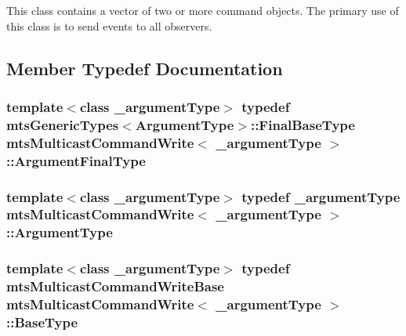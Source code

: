 This class contains a vector of two or more command objects. The primary use of this class is to send events to all observers. 

\subsection{Member Typedef Documentation}
\hypertarget{classmts_multicast_command_write_a6a53ad6556ef466ffc58b8800ca81f46}{
\subsubsection[{Argument\-Final\-Type}]{\setlength{\rightskip}{0pt plus 5cm}template$<$class \-\_\-argument\-Type$>$ typedef {\bf mts\-Generic\-Types}$<${\bf Argument\-Type}$>$\-::Final\-Base\-Type {\bf mts\-Multicast\-Command\-Write}$<$ \-\_\-argument\-Type $>$\-::{\bf Argument\-Final\-Type}}}\label{classmts_multicast_command_write_a6a53ad6556ef466ffc58b8800ca81f46}
\hypertarget{classmts_multicast_command_write_a064ab3c37be15f5f41dc6fd39595f207}{
\subsubsection[{Argument\-Type}]{\setlength{\rightskip}{0pt plus 5cm}template$<$class \-\_\-argument\-Type$>$ typedef \-\_\-argument\-Type {\bf mts\-Multicast\-Command\-Write}$<$ \-\_\-argument\-Type $>$\-::{\bf Argument\-Type}}}\label{classmts_multicast_command_write_a064ab3c37be15f5f41dc6fd39595f207}
\hypertarget{classmts_multicast_command_write_aa950168043db4770666c31d84145a37a}{
\subsubsection[{Base\-Type}]{\setlength{\rightskip}{0pt plus 5cm}template$<$class \-\_\-argument\-Type$>$ typedef {\bf mts\-Multicast\-Command\-Write\-Base} {\bf mts\-Multicast\-Command\-Write}$<$ \-\_\-argument\-Type $>$\-::{\bf Base\-Type}}}\label{classmts_multicast_command_write_aa950168043db4770666c31d84145a37a}


